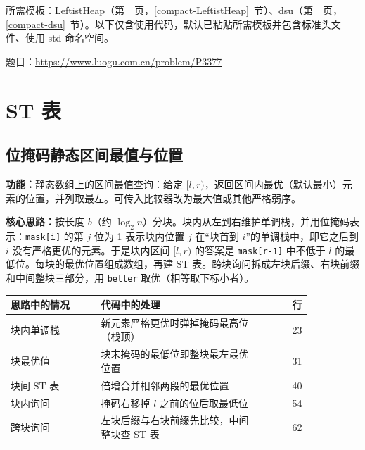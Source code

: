 所需模板：\hyperref[compact-LeftistHeap]{LeftistHeap}（第~\pageref{compact-LeftistHeap}~页，\ref{compact-LeftistHeap}~节）、\hyperref[compact-dsu]{dsu}（第~\pageref{compact-dsu}~页，\ref{compact-dsu}~节）。以下仅含使用代码，默认已粘贴所需模板并包含标准头文件、使用 std 命名空间。

题目：\url{https://www.luogu.com.cn/problem/P3377}



\Needspace{180pt}

\chapter{ST 表}

\section{位掩码静态区间最值与位置}\label{compact-StaticRMQ}

\noindent\textbf{功能：}\allowbreak 静态数组上的区间最值查询：给定 $[l,r)$，返回区间内最优（默认最小）元素的位置，并列取最左。可传入比较器改为最大值或其他严格弱序。

\textbf{核心思路：}\allowbreak 按长度 $b$（约 $\log_2 n$）分块。块内从左到右维护单调栈，并用位掩码表示：\texttt{mask[i]} 的第 $j$ 位为 1 表示块内位置 $j$ 在“块首到 $i$”的单调栈中，即它之后到 $i$ 没有严格更优的元素。于是块内区间 $[l,r)$ 的答案是 \texttt{mask[r-1]} 中不低于 $l$ 的最低位。每块的最优位置组成数组，再建 ST 表。跨块询问拆成左块后缀、右块前缀和中间整块三部分，用 \texttt{better} 取优（相等取下标小者）。

\begin{center}\small
\begin{tabular}{@{}p{0.30\linewidth}p{0.55\linewidth}r@{}}
\toprule
思路中的情况 & 代码中的处理 & 行\\
\midrule
块内单调栈 & 新元素严格更优时弹掉掩码最高位（栈顶） & 23\\
块最优值 & 块末掩码的最低位即整块最左最优位置 & 31\\
块间 ST 表 & 倍增合并相邻两段的最优位置 & 40\\
块内询问 & 掩码右移掉 $l$ 之前的位后取最低位 & 54\\
跨块询问 & 左块后缀与右块前缀先比较，中间整块查 ST 表 & 62\\
\bottomrule
\end{tabular}
\end{center}



